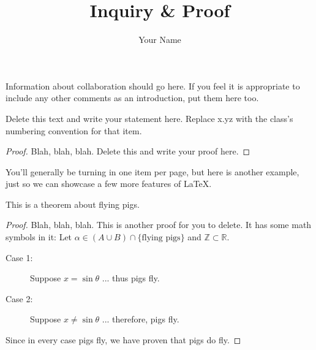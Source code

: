 \documentclass[12pt]{article}
\newenvironment{theorem}[2][Theorem]{\begin{trivlist}
\item[\hskip \labelsep {\bfseries #1}\hskip \labelsep {\bfseries #2.}]}{\end{trivlist}}
\newenvironment{problem}[2][Problem]{\begin{trivlist}
\item[\hskip \labelsep {\bfseries #1}\hskip \labelsep {\bfseries #2.}]}{\end{trivlist}}
\begin{document}
 
 
\title{Inquiry \& Proof} 
\author{Your Name} %
\maketitle

\noindent Information about collaboration should go here.  If you feel it is appropriate to include any other comments as an introduction, put them here too.

\begin{problem}{x.yz} %
Delete this text and write your statement here. Replace x.yz with the class's numbering convention for that item.
\end{problem}
 
\begin{proof}  
Blah, blah, blah. Delete this and write your proof here.
\end{proof}
 
\bigskip

\noindent You'll generally be turning in one item per page, but here is another example, just so we can showcase a few more features of \LaTeX.   

\bigskip

\begin{theorem}{w.xy}
This is a theorem about flying pigs.
\end{theorem}
 
\begin{proof}
Blah, blah, blah.  This is another proof for you to delete. It has some math symbols in it:  Let $\alpha \in (A \cup B) \cap \{\text{flying pigs}\}$ and $\mathbb{Z} \subset \mathbb{R}$.  

\begin{description}
\item[Case 1:] Suppose $x=\sin\theta$ ... thus pigs fly.
\item[Case 2:] Suppose $x \neq \sin\theta$ ... therefore, pigs fly.
\end{description}
Since in every case pigs fly, we have proven that pigs do fly.

\end{proof}
\end{document}
